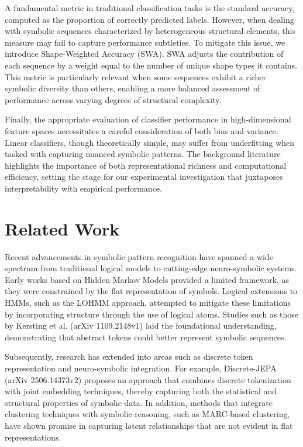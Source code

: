 \documentclass{article}
\begin{document}
A fundamental metric in traditional classification tasks is the standard accuracy, computed as the proportion of correctly predicted labels. However, when dealing with symbolic sequences characterized by heterogeneous structural elements, this measure may fail to capture performance subtleties. To mitigate this issue, we introduce Shape-Weighted Accuracy (SWA). SWA adjusts the contribution of each sequence by a weight equal to the number of unique shape types it contains. This metric is particularly relevant when some sequences exhibit a richer symbolic diversity than others, enabling a more balanced assessment of performance across varying degrees of structural complexity.

Finally, the appropriate evaluation of classifier performance in high-dimensional feature spaces necessitates a careful consideration of both bias and variance. Linear classifiers, though theoretically simple, may suffer from underfitting when tasked with capturing nuanced symbolic patterns. The background literature highlights the importance of both representational richness and computational efficiency, setting the stage for our experimental investigation that juxtaposes interpretability with empirical performance.

\section{Related Work}
Recent advancements in symbolic pattern recognition have spanned a wide spectrum from traditional logical models to cutting-edge neuro-symbolic systems. Early works based on Hidden Markov Models provided a limited framework, as they were constrained by the flat representation of symbols. Logical extensions to HMMs, such as the LOHMM approach, attempted to mitigate these limitations by incorporating structure through the use of logical atoms. Studies such as those by Kersting et al. (arXiv 1109.2148v1) laid the foundational understanding, demonstrating that abstract tokens could better represent symbolic sequences.

Subsequently, research has extended into areas such as discrete token representation and neuro-symbolic integration. For example, Discrete-JEPA (arXiv 2506.14373v2) proposes an approach that combines discrete tokenization with joint embedding techniques, thereby capturing both the statistical and structural properties of symbolic data. In addition, methods that integrate clustering techniques with symbolic reasoning, such as MARC-based clustering, have shown promise in capturing latent relationships that are not evident in flat representations.
\end{document}
